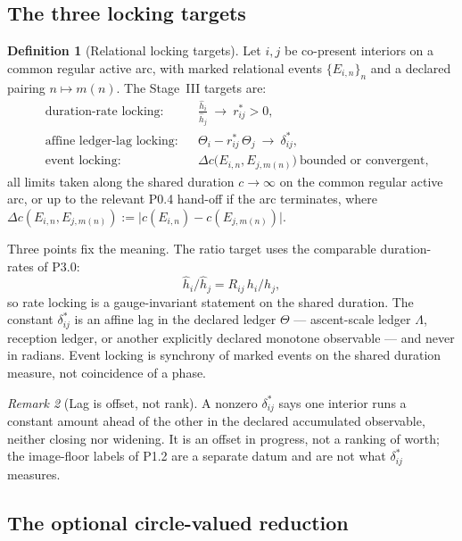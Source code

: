 \documentclass[11pt,a4paper]{article}
\def\mathfrak#1{#1}%
\def\emph#1{#1}%
\theoremstyle{definition}
\newtheorem{definition}{Definition}[section]
\theoremstyle{plain}
\theoremstyle{remark}
\newtheorem{remark}[definition]{Remark}
\begin{document}
\subsection{The three locking targets}

\begin{definition}[Relational locking targets]\label{def:locking}
Let \(i,j\) be co-present interiors on a common regular active arc, with marked
relational events \(\{E_{i,n}\}_n\) and a declared pairing \(n\mapsto m(n)\). The
Stage~III targets are:
\begin{align*}
&\text{\emph{duration-rate locking:}}
&&\frac{\hat h_i}{\hat h_j}\ \longrightarrow\ r^*_{ij}>0,\\[2pt]
&\text{\emph{affine ledger-lag locking:}}
&&\Theta_i-r^*_{ij}\,\Theta_j\ \longrightarrow\ \delta^*_{ij},\\[2pt]
&\text{\emph{event locking:}}
&&\Delta\mathfrak c\bigl(E_{i,n},E_{j,m(n)}\bigr)
\ \text{bounded or convergent,}
\end{align*}
all limits taken along the shared duration \(\mathfrak c\to\infty\) on the common
regular active arc, or up to the relevant P0.4 hand-off if the arc terminates,
where \(\Delta\mathfrak c(E_{i,n},E_{j,m(n)}):=\bigl|\mathfrak c(E_{i,n})-\mathfrak c(E_{j,m(n)})\bigr|\).
\end{definition}

Three points fix the meaning. The ratio target uses the comparable duration-rates
of P3.0:
\[
\hat h_i/\hat h_j=R_{ij}\,h_i/h_j,
\]
so rate locking is a gauge-invariant statement on the shared duration. The
constant \(\delta^*_{ij}\) is an affine lag in the declared ledger \(\Theta\) ---
ascent-scale ledger \(\Lambda\), reception ledger, or another explicitly declared
monotone observable --- and never in radians. Event locking is synchrony of marked
events on the shared duration measure, not coincidence of a phase.

\begin{remark}[Lag is offset, not rank]\label{rem:lagnotrank}
A nonzero \(\delta^*_{ij}\) says one interior runs a constant amount ahead of the other in
the declared accumulated observable, neither closing nor widening. It is an offset in
progress, not a ranking of worth; the image-floor labels of P1.2 are a separate datum and
are not what \(\delta^*_{ij}\) measures.
\end{remark}

\subsection{The optional circle-valued reduction}
\end{document}
